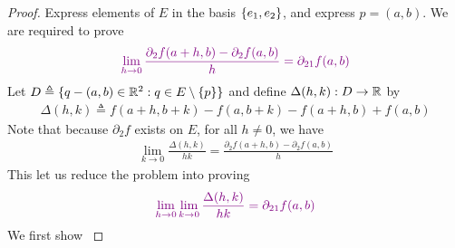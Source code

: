 \documentclass{report}
\begin{document}
\begin{proof}
Express elements of $E$ in the basis $\{ e_1,e_2 \}$, and express $p=(a,b)$. We are required to prove 
\begin{align*}
  \textcolor{violet}{\lim_{h\to 0}\frac{\partial_2f(a+h,b)-\partial_2 f(a,b)}{h}=\partial_{21}f(a,b)}
\end{align*}
Let $D\triangleq \{ q-(a,b)\in\mathbb{R}^2:q\in E\setminus \{ p \} \}$ and define $\Delta(h,k):D\rightarrow \mathbb{R}$ by 
\begin{align*}
\Delta(h,k)\triangleq f(a+h,b+k)-f(a,b+k)-f(a+h,b)+f(a,b)
\end{align*}
Note that because $\partial_2f$ exists on $E$, for all $h\neq 0$, we have 
 \begin{align*}
\lim_{k\to 0} \frac{\Delta (h,k)}{hk}=\frac{\partial_2 f(a+h,b)-\partial_2 f(a,b)}{h}
\end{align*}
This let us reduce the problem into proving 
\begin{align*}
  \textcolor{violet}{\lim_{h\to 0}\lim_{k\to 0} \frac{\Delta (h,k)}{hk}=\partial_{21}f(a,b)}
\end{align*}
We first show 
\label{oea}


\end{proof}
\end{document}
